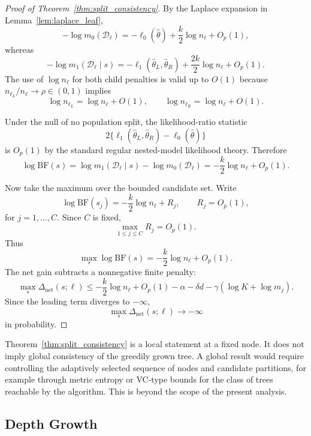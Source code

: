 \begin{proof}[Proof of Theorem~\ref{thm:split_consistency}]
By the Laplace expansion in Lemma~\ref{lem:laplace_leaf},
\[
-\log m_0(\mathcal{D}_\ell)
=
-\ell_0(\hat{\theta})
+
\frac{k}{2}\log n_\ell
+
O_p(1),
\]
whereas
\[
-\log m_1(\mathcal{D}_\ell\mid s)
=
-\ell_1(\hat{\theta}_L,\hat{\theta}_R)
+
\frac{2k}{2}\log n_\ell
+
O_p(1).
\]
The use of $\log n_\ell$ for both child penalties is valid up to $O(1)$ because
$n_{\ell_L}/n_\ell\to\rho\in(0,1)$ implies
\[
\log n_{\ell_L}
=
\log n_\ell + O(1),
\qquad
\log n_{\ell_R}
=
\log n_\ell + O(1).
\]

Under the null of no population split, the likelihood-ratio statistic
\[
2\{\ell_1(\hat{\theta}_L,\hat{\theta}_R)-\ell_0(\hat{\theta})\}
\]
is $O_p(1)$ by the standard regular nested-model likelihood theory.
Therefore
\[
\log \mathrm{BF}(s)
=
\log m_1(\mathcal{D}_\ell\mid s)
-
\log m_0(\mathcal{D}_\ell)
=
-\frac{k}{2}\log n_\ell
+
O_p(1).
\]

Now take the maximum over the bounded candidate set.
Write
\[
\log \mathrm{BF}(s_j)
=
-\frac{k}{2}\log n_\ell
+
R_j,
\qquad
R_j=O_p(1),
\]
for $j=1,\dots,C$.
Since $C$ is fixed,
\[
\max_{1\le j\le C}R_j=O_p(1).
\]
Thus
\[
\max_s \log \mathrm{BF}(s)
=
-\frac{k}{2}\log n_\ell
+
O_p(1).
\]
The net gain subtracts a nonnegative finite penalty:
\[
\max_s \Delta_{\mathrm{net}}(s;\ell)
\le
-\frac{k}{2}\log n_\ell
+
O_p(1)
-
\alpha
-
\delta d
-
\gamma(\log K+\log m_j).
\]
Since the leading term diverges to $-\infty$,
\[
\max_s \Delta_{\mathrm{net}}(s;\ell)
\to -\infty
\]
in probability.
\end{proof}

\begin{remark}
Theorem~\ref{thm:split_consistency} is a local statement at a fixed node. It does not imply global consistency of the greedily grown tree. A global result would require controlling the adaptively selected sequence of nodes and candidate partitions, for example through metric entropy or VC-type bounds for the class of trees reachable by the algorithm. This is beyond the scope of the present analysis.
\end{remark}


\subsection{Depth Growth}
\label{app:depth_bound}

